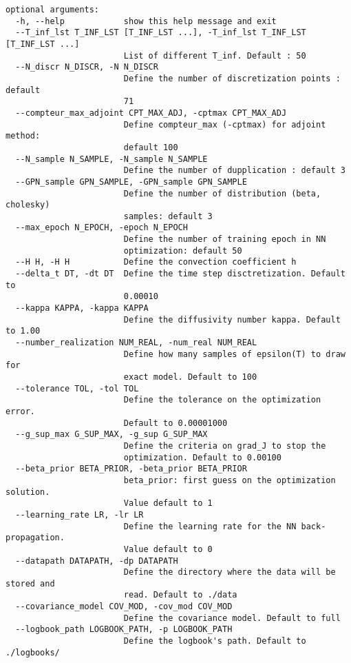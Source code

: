 \documentclass[a4paper,12pt]{article}
\numberwithin{equation}{section} %
\begin{document}
\begin{lstlisting}
optional arguments:
  -h, --help            show this help message and exit
  --T_inf_lst T_INF_LST [T_INF_LST ...], -T_inf_lst T_INF_LST [T_INF_LST ...]
                        List of different T_inf. Default : 50
  --N_discr N_DISCR, -N N_DISCR
                        Define the number of discretization points : default
                        71
  --compteur_max_adjoint CPT_MAX_ADJ, -cptmax CPT_MAX_ADJ
                        Define compteur_max (-cptmax) for adjoint method:
                        default 100
  --N_sample N_SAMPLE, -N_sample N_SAMPLE
                        Define the number of dupplication : default 3
  --GPN_sample GPN_SAMPLE, -GPN_sample GPN_SAMPLE
                        Define the number of distribution (beta, cholesky)
                        samples: default 3
  --max_epoch N_EPOCH, -epoch N_EPOCH
                        Define the number of training epoch in NN
                        optimization: default 50
  --H H, -H H           Define the convection coefficient h
  --delta_t DT, -dt DT  Define the time step disctretization. Default to
                        0.00010
  --kappa KAPPA, -kappa KAPPA
                        Define the diffusivity number kappa. Default to 1.00
  --number_realization NUM_REAL, -num_real NUM_REAL
                        Define how many samples of epsilon(T) to draw for
                        exact model. Default to 100
  --tolerance TOL, -tol TOL
                        Define the tolerance on the optimization error.
                        Default to 0.00001000
  --g_sup_max G_SUP_MAX, -g_sup G_SUP_MAX
                        Define the criteria on grad_J to stop the
                        optimization. Default to 0.00100
  --beta_prior BETA_PRIOR, -beta_prior BETA_PRIOR
                        beta_prior: first guess on the optimization solution.
                        Value default to 1
  --learning_rate LR, -lr LR
                        Define the learning rate for the NN back-propagation.
                        Value default to 0
  --datapath DATAPATH, -dp DATAPATH
                        Define the directory where the data will be stored and
                        read. Default to ./data
  --covariance_model COV_MOD, -cov_mod COV_MOD
                        Define the covariance model. Default to full
  --logbook_path LOGBOOK_PATH, -p LOGBOOK_PATH
                        Define the logbook's path. Default to ./logbooks/

\end{lstlisting}

\pagebreak
\end{document}
